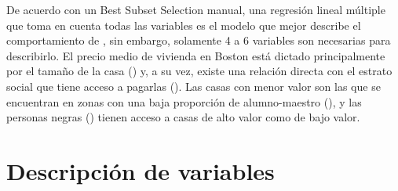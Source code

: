 \documentclass[11pt, letterpaper]{article}
\begin{document}
De acuerdo con un Best Subset Selection manual, una regresión lineal múltiple que toma en cuenta todas las variables es el modelo que mejor describe el comportamiento de , sin embargo, solamente 4 a 6 variables son necesarias para describirlo. El precio medio de vivienda en Boston está dictado principalmente por el tamaño de la casa () y, a su vez, existe una relación directa con el estrato social que tiene acceso a pagarlas (). Las casas con menor valor son las que se encuentran en zonas con una baja proporción de alumno-maestro (), y las personas negras () tienen acceso a casas de alto valor como de bajo valor.

\printbibliography

\newpage
\appendix
\section{Descripción de variables}
\end{document}
